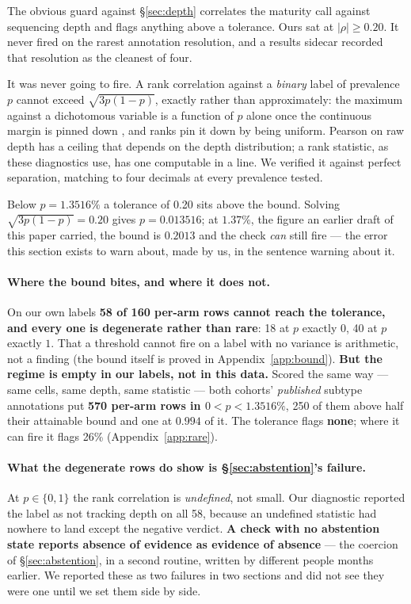 \documentclass{article}
\begin{document}
The obvious guard against \S\ref{sec:depth} correlates the maturity call against
sequencing depth and flags anything above a tolerance. Ours sat at
$|\rho| \geq 0.20$. It never fired on the rarest annotation resolution, and a
results sidecar recorded that resolution as the cleanest of four.

It was never going to fire. A rank correlation against a \emph{binary} label of
prevalence $p$ cannot exceed $\sqrt{3p(1-p)}$, exactly rather than approximately:
the maximum against a dichotomous variable is a function of $p$ alone once the
continuous margin is pinned down \citep{chengliu2016}, and ranks pin it down by
being uniform. Pearson on raw depth has a ceiling that depends on the depth
distribution; a rank statistic, as these diagnostics use, has one computable in a
line. We verified it against perfect separation, matching to four decimals at
every prevalence tested.

Below $p = 1.3516\%$ a tolerance of 0.20 sits above the bound. Solving
$\sqrt{3p(1-p)} = 0.20$ gives $p = 0.013516$; at $1.37\%$, the figure an earlier
draft of this paper carried, the bound is $0.2013$ and the check \emph{can} still
fire --- the error this section exists to warn about, made by us, in the sentence
warning about it.

\paragraph{Where the bound bites, and where it does not.} On our own labels
\textbf{58 of 160 per-arm rows cannot reach the tolerance, and every one is
degenerate rather than rare}: 18 at $p$ exactly $0$, 40 at $p$ exactly $1$. That
a threshold cannot fire on a label with no variance is arithmetic, not a finding
(the bound itself is proved in Appendix~\ref{app:bound}). \textbf{But the regime
is empty in our labels, not in this data.} Scored the same way --- same cells,
same depth, same statistic --- both cohorts' \emph{published} subtype
annotations put \textbf{570 per-arm rows in $0 < p < 1.3516\%$}, 250 of them
above half their attainable bound and one at $0.994$ of it. The tolerance flags
\textbf{none}; where it can fire it flags 26\% (Appendix~\ref{app:rare}).

\paragraph{What the degenerate rows do show is \S\ref{sec:abstention}'s failure.}
At $p \in \{0,1\}$ the rank correlation is \emph{undefined}, not small. Our
diagnostic reported the label as not tracking depth on all 58, because an
undefined statistic had nowhere to land except the negative verdict. \textbf{A
check with no abstention state reports absence of evidence as evidence of
absence} --- the coercion of \S\ref{sec:abstention}, in a second routine, written
by different people months earlier. We reported these as two failures in two
sections and did not see they were one until we set them side by side.
\end{document}
